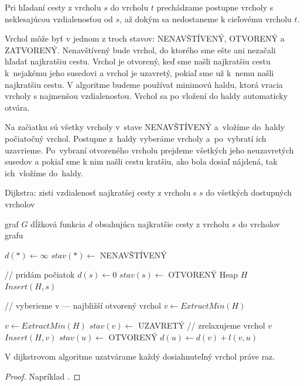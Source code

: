 Pri hľadaní cesty z vrcholu $s$ do vrcholu $t$ prechádzame postupne vrcholy s neklesajúcou vzdialenosťou od $s$, až dokým sa nedostaneme k cieľovému vrcholu $t$.

Vrchol môže byť v jednom z troch stavov: NENAVŠTÍVENÝ, OTVORENÝ a ZATVORENÝ.
Nenavštívený bude vrchol, do ktorého sme ešte ani nezačali hľadať najkratšiu cestu. Vrchol je otvorený, keď sme našli najkratšiu cestu 
k~nejakému jeho susedovi a vrchol je uzavretý, pokiaľ sme už k~nemu našli najkratšiu cestu.
V algoritme budeme používať minimovú haldu, ktorá vracia vrcholy s najmenšou vzdialenosťou.
Vrchol sa po vložení do haldy automaticky otvára.

Na začiatku sú všetky vrcholy v~stave NENAVŠTÍVENÝ a~vložíme do~haldy počiatočný vrchol.
Postupne z~haldy vyberáme vrcholy a~po~vybratí ich uzavrieme. 
Po~vybraní otvoreného vrcholu prejdeme všetkých jeho neuzavretých susedov a pokiaľ sme k nim našli cestu kratšiu, ako bola dosiaľ nájdená, tak ich~vložíme do~haldy.


\begin{algorithm}
\caption{Dijkstra: zisti vzdialenosť najkratšej cesty z vrcholu s $s$ do všetkých dostupných vrcholov}
\label{alg:dijkstra}
\begin{algorithmic}[1] %
\REQUIRE graf $G$
\ENSURE dĺžková funkcia $d$ obsahujúca najkratšie cesty  z vrcholu $s$ do vrcholov grafu


\STATE $ d(*) \leftarrow \infty $
\STATE $ stav(*) \leftarrow$ NENAVŠTÍVENÝ

\STATE // pridám počiatok
\STATE $d(s) \leftarrow 0$
\STATE $stav(s) \leftarrow $ OTVORENÝ
\STATE Heap $H$
\STATE $Insert(H, s)$

	
	\STATE // vyberieme v --- najbližší otvorený vrchol
	\STATE $v \leftarrow ExtractMin(H)$
	
		\STATE $v \leftarrow ExtractMin(H)$
	\ENDWHILE
	\STATE $stav(v) \leftarrow$ UZAVRETÝ
	\STATE // zrelaxujeme vrchol $v$
			\STATE $Insert(H, v)$
			\STATE $stav(u) \leftarrow$ OTVORENÝ
			\STATE $d(u) \leftarrow d(v) + l(v, u)$
			
		\ENDIF
	\ENDFOR
\ENDWHILE

\end{algorithmic}
\end{algorithm}

\begin{theorem}
V dijkstrovom algoritme uzatvárame každý dosiahnuteľný vrchol práve raz.
\end{theorem}
\begin{proof}
Napríklad \cite{mares07}.
\end{proof}

